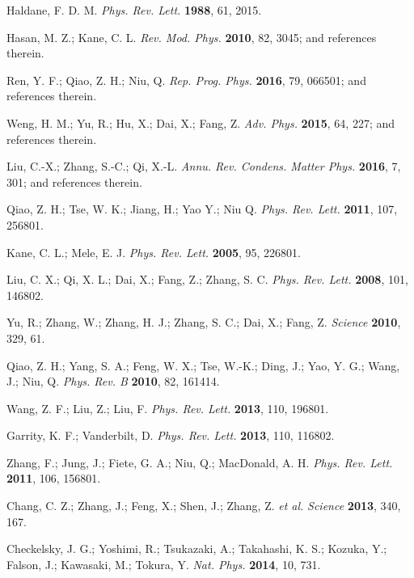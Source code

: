 \documentclass[journal=nalefd,manuscript=communication]{achemso}
\begin{document}
\begin{thebibliography}{99}

Haldane, F. D. M. \textit{Phys. Rev. Lett.} \textbf{1988}, 61, 2015.

Hasan, M. Z.; Kane, C. L. \textit{Rev. Mod. Phys.} \textbf{2010}, 82, 3045; and references therein.

Ren, Y. F.; Qiao, Z. H.; Niu, Q. \textit{Rep. Prog. Phys.} \textbf{2016}, 79, 066501; and references therein.

Weng, H. M.; Yu, R.; Hu, X.; Dai, X.; Fang, Z. \textit{Adv. Phys.} \textbf{2015}, 64, 227; and references therein.

Liu, C.-X.; Zhang, S.-C.; Qi, X.-L. \textit{Annu. Rev. Condens. Matter Phys.} \textbf{2016}, 7, 301; and references therein.

Qiao, Z. H.; Tse, W. K.; Jiang, H.; Yao Y.; Niu Q. \textit{Phys. Rev. Lett.} \textbf{2011}, 107, 256801.

Kane, C. L.; Mele, E. J. \textit{Phys. Rev. Lett.} \textbf{2005}, 95, 226801.

Liu, C. X.; Qi,  X. L.; Dai, X.; Fang, Z.; Zhang, S. C. \textit{Phys. Rev. Lett.} \textbf{2008}, 101, 146802.

Yu, R.; Zhang, W.; Zhang, H. J.; Zhang, S. C.; Dai, X.; Fang, Z. \textit{Science} \textbf{2010}, 329, 61.

Qiao, Z. H.; Yang, S. A.; Feng, W. X.; Tse, W.-K.; Ding, J.; Yao, Y. G.; Wang, J.; Niu, Q. \textit{Phys. Rev. B} \textbf{2010}, 82, 161414.

Wang, Z. F.; Liu, Z.; Liu, F. \textit{Phys. Rev. Lett.} \textbf{2013}, 110, 196801.

Garrity, K. F.; Vanderbilt, D. \textit{Phys. Rev. Lett.} \textbf{2013}, 110, 116802.

Zhang, F.; Jung, J.; Fiete, G. A.; Niu, Q.; MacDonald, A. H. \textit{Phys. Rev. Lett.} \textbf{2011}, 106, 156801.

Chang, C. Z.; Zhang, J.; Feng, X.; Shen, J.; Zhang, Z. \textit{et al.} \textit{Science} \textbf{2013}, 340, 167.

Checkelsky, J. G.; Yoshimi, R.; Tsukazaki, A.; Takahashi, K. S.; Kozuka, Y.; Falson, J.; Kawasaki, M.; Tokura, Y. \textit{Nat. Phys.} \textbf{2014}, 10, 731.


\end{thebibliography}
\end{document}
